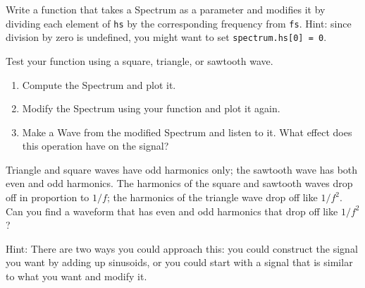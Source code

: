 \begin{exercise}
	Write a function that takes a Spectrum as a parameter and modifies
	it by dividing each element of {\tt hs} by the corresponding frequency
	from {\tt fs}.  Hint: since division by zero is undefined, you
	might want to set {\tt spectrum.hs[0] = 0}.
	
	Test your function using a square, triangle, or sawtooth wave.
	
	\begin{enumerate}
		
		\item Compute the Spectrum and plot it.
		
		\item Modify the Spectrum using your function and plot it again.
		
		\item Make a Wave from the modified Spectrum and listen to it.  What
		effect does this operation have on the signal?
		
	\end{enumerate}
	
\end{exercise}

\begin{exercise}
	Triangle and square waves have odd harmonics only; the sawtooth
	wave has both even and odd harmonics.  The harmonics of the
	square and sawtooth waves drop off in proportion to $1/f$; the
	harmonics of the triangle wave drop off like $1/f^2$.  Can you
	find a waveform that has even and odd harmonics that drop off
	like $1/f^2$?
	
	Hint: There are two ways you could approach this: you could
	construct the signal you want by adding up sinusoids, or you
	could start with a signal that is similar to what you want and
	modify it.
\end{exercise}
